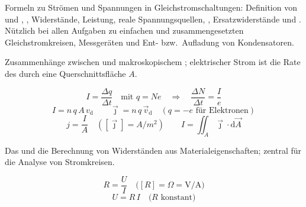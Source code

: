 

\begin{runintext}
Formeln zu Strömen und Spannungen in Gleichstromschaltungen: Definition von  und , , Widerstände, Leistung, reale Spannungsquellen, , Ersatzwiderstände und . Nützlich bei allen Aufgaben zu einfachen und zusammengesetzten Gleichstromkreisen, Messgeräten und Ent- bzw.\ Aufladung von Kondensatoren.
\end{runintext}

\begin{runintext}
Zusammenhänge zwischen  und makroskopischem ; elektrischer Strom ist die Rate des  durch eine Querschnittsfläche $A$.
\end{runintext}
\begin{formulabox}
\[ I = \frac{\Delta q}{\Delta t} \quad \text{mit } q = N e \quad\Rightarrow\quad \frac{\Delta N}{\Delta t} = \frac{I}{e} \]
\formulasep
\[ I = n\,q\,A\,v_{\mathrm{d}} \qquad \vec{\jmath} = n\,q\,\vec{v}_{\mathrm{d}} \quad (q = -e \text{ für Elektronen}) \]
\formulasep
\[ j = \frac{I}{A} \quad ([\vec{\jmath}] = \si{A/m^2}) \qquad I = \iint_A \vec{\jmath} \cdot \mathrm{d}\vec{A} \]
\end{formulabox}

\begin{runintext}
Das  und die Berechnung von Widerständen aus Materialeigenschaften; zentral für die Analyse von Stromkreisen.
\end{runintext}
\begin{formulabox}
\[ R = \frac{U}{I} \quad \text{($[R] = \Omega = \text{V/A}$)} \]
\[ U = R\,I \quad \text{($R$ konstant)} \]
\end{formulabox}

